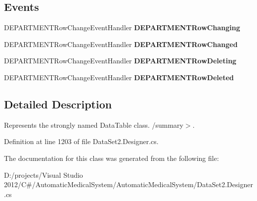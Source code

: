 \subsection*{Events}
\begin{CompactItemize}
\item 
DEPARTMENTRowChangeEventHandler \textbf{DEPARTMENTRowChanging}\label{class_automatic_medical_system_1_1_data_set2_1_1_d_e_p_a_r_t_m_e_n_t_data_table_ad94a07225471f1b9e5884b88296b789}

\item 
DEPARTMENTRowChangeEventHandler \textbf{DEPARTMENTRowChanged}\label{class_automatic_medical_system_1_1_data_set2_1_1_d_e_p_a_r_t_m_e_n_t_data_table_bc42485e239216c5b97a13f0b20dc474}

\item 
DEPARTMENTRowChangeEventHandler \textbf{DEPARTMENTRowDeleting}\label{class_automatic_medical_system_1_1_data_set2_1_1_d_e_p_a_r_t_m_e_n_t_data_table_db0914f10f6e77c2431f021aea36a7a9}

\item 
DEPARTMENTRowChangeEventHandler \textbf{DEPARTMENTRowDeleted}\label{class_automatic_medical_system_1_1_data_set2_1_1_d_e_p_a_r_t_m_e_n_t_data_table_0b2a2d31c8f3b466ef840eaa76d100c1}

\end{CompactItemize}


\subsection{Detailed Description}
Represents the strongly named DataTable class. /summary$>$. 

Definition at line 1203 of file DataSet2.Designer.cs.

The documentation for this class was generated from the following file:\begin{CompactItemize}
\item 
D:/projects/Visual Studio 2012/C\#/AutomaticMedicalSystem/AutomaticMedicalSystem/DataSet2.Designer.cs\end{CompactItemize}
